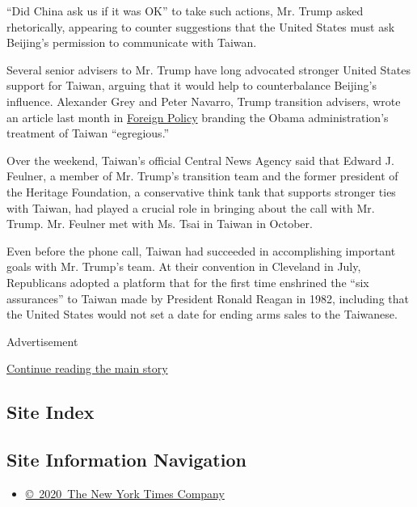 ``Did China ask us if it was OK'' to take such actions, Mr. Trump asked
rhetorically, appearing to counter suggestions that the United States
must ask Beijing's permission to communicate with Taiwan.

Several senior advisers to Mr. Trump have long advocated stronger United
States support for Taiwan, arguing that it would help to counterbalance
Beijing's influence. Alexander Grey and Peter Navarro, Trump transition
advisers, wrote an article last month in
\href{http://foreignpolicy.com/2016/11/07/donald-trumps-peace-through-strength-vision-for-the-asia-pacific/}{Foreign
Policy} branding the Obama administration's treatment of Taiwan
``egregious.''

Over the weekend, Taiwan's official Central News Agency said that Edward
J. Feulner, a member of Mr. Trump's transition team and the former
president of the Heritage Foundation, a conservative think tank that
supports stronger ties with Taiwan, had played a crucial role in
bringing about the call with Mr. Trump. Mr. Feulner met with Ms. Tsai in
Taiwan in October.

Even before the phone call, Taiwan had succeeded in accomplishing
important goals with Mr. Trump's team. At their convention in Cleveland
in July, Republicans adopted a platform that for the first time
enshrined the ``six assurances'' to Taiwan made by President Ronald
Reagan in 1982, including that the United States would not set a date
for ending arms sales to the Taiwanese.

Advertisement

\protect\hyperlink{after-bottom}{Continue reading the main story}

\hypertarget{site-index}{%
\subsection{Site Index}\label{site-index}}

\hypertarget{site-information-navigation}{%
\subsection{Site Information
Navigation}\label{site-information-navigation}}

\begin{itemize}
\tightlist
\item
  \href{https://help.nytimes.com/hc/en-us/articles/115014792127-Copyright-notice}{©~2020~The
  New York Times Company}
\end{itemize}

